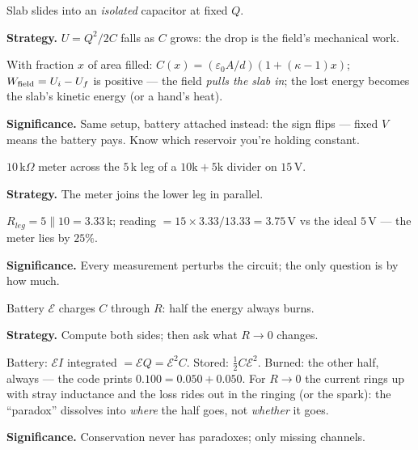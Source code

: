\begin{example}\label{ex:w14}
Slab slides into an \emph{isolated} capacitor at fixed $Q$.
\par\smallskip
\textbf{Strategy.} $U=Q^{2}/2C$ falls as $C$ grows: the drop is the
field's mechanical work.
\begin{solution}
With fraction $x$ of area filled: $C(x)=(\varepsilon_0A/d)(1+(\kappa-1)x)$;
$W_{\rm field}=U_i-U_f$ is positive --- the field \emph{pulls the slab
in}; the lost energy becomes the slab's kinetic energy (or a hand's
heat). \checkmark
\end{solution}
\textbf{Significance.} Same setup, battery attached instead: the sign
flips --- fixed $V$ means the battery pays. Know which reservoir
you're holding constant.
\end{example}

\begin{example}\label{ex:w15}
$10$\,k$\Omega$ meter across the $5$\,k leg of a
$10\text{k}+5\text{k}$ divider on $15$\,V.
\par\smallskip
\textbf{Strategy.} The meter joins the lower leg in parallel.
\begin{solution}
$R_{leg}=5\|10=3.33$\,k; reading
$=15\times3.33/13.33=3.75$\,V vs the ideal $5$\,V --- the meter lies
by $25\%$. \checkmark
\end{solution}
\textbf{Significance.} Every measurement perturbs the circuit; the
only question is by how much.
\end{example}

\begin{example}\label{ex:w16}
Battery $\mathcal E$ charges $C$ through $R$: half the energy always
burns.
\par\smallskip
\textbf{Strategy.} Compute both sides; then ask what $R\to0$ changes.
\begin{solution}
Battery: $\mathcal EI$ integrated $=\mathcal EQ=\mathcal E^{2}C$.
Stored: $\tfrac12C\mathcal E^{2}$. Burned: the other half, always ---
the code prints $0.100=0.050+0.050$. For $R\to0$ the current rings up
with stray inductance and the loss rides out in the ringing (or the
spark): the ``paradox'' dissolves into \emph{where} the half goes,
not \emph{whether} it goes. \checkmark
\end{solution}
\textbf{Significance.} Conservation never has paradoxes; only missing
channels.
\end{example}

